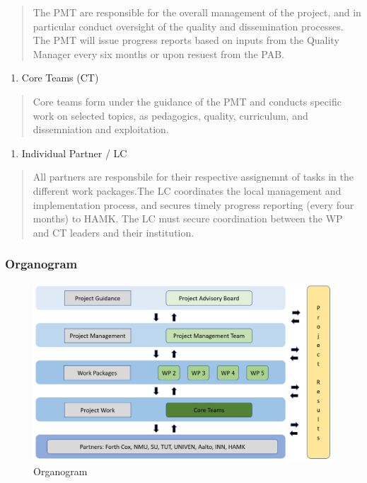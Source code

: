 \documentclass[
  11pt,
]{article}
\providecommand{\tightlist}{%
  \setlength{\itemsep}{0pt}\setlength{\parskip}{0pt}}
\begin{document}
\begin{quote}
The PMT are responsible for the overall management of the project, and
in particular conduct oversight of the quality and dissemination
processes. The PMT will issue progress reports based on inputs from the
Quality Manager every six months or upon resuest from the PAB.
\end{quote}

\begin{enumerate}
\def\labelenumi{\arabic{enumi}.}
\setcounter{enumi}{2}
\tightlist
\item
  Core Teams (CT)
\end{enumerate}

\begin{quote}
Core teams form under the guidance of the PMT and conducts specific work
on selected topics, as pedagogics, quality, curriculum, and
dissemniation and exploitation.
\end{quote}

\begin{enumerate}
\def\labelenumi{\arabic{enumi}.}
\setcounter{enumi}{3}
\tightlist
\item
  Individual Partner / LC
\end{enumerate}

\begin{quote}
All partners are responsbile for their respective assignemnt of tasks in
the different work packages.The LC coordinates the local management and
implementation process, and secures timely progress reporting (every
four months) to HAMK. The LC must secure coordination between the WP and
CT leaders and their institution.
\end{quote}

\hypertarget{organogram}{%
\subsubsection{Organogram}\label{organogram}}

\begin{figure}
\centering
\includegraphics{Organogram.png}
\caption{Organogram}
\end{figure}
\end{document}
